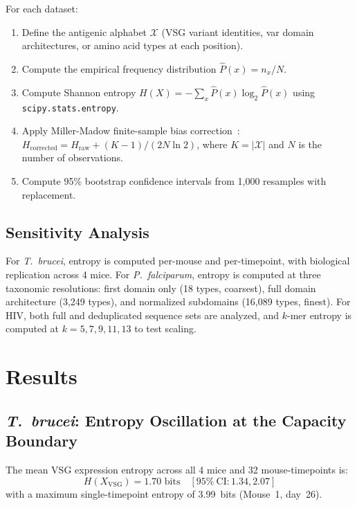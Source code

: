 \documentclass[twocolumn,10pt]{article}
\begin{document}
For each dataset:
\begin{enumerate}
\item Define the antigenic alphabet $\mathcal{X}$ (VSG variant identities, var domain architectures, or amino acid types at each position).
\item Compute the empirical frequency distribution $\hat{P}(x) = n_x / N$.
\item Compute Shannon entropy $H(X) = -\sum_x \hat{P}(x) \log_2 \hat{P}(x)$ using \texttt{scipy.stats.entropy}.
\item Apply Miller-Madow finite-sample bias correction~\citep{miller1955}: $H_{\text{corrected}} = H_{\text{raw}} + (K-1)/(2N\ln 2)$, where $K = |\mathcal{X}|$ and $N$ is the number of observations.
\item Compute 95\% bootstrap confidence intervals from 1,000 resamples with replacement.
\end{enumerate}

\subsection{Sensitivity Analysis}

For \textit{T.~brucei}, entropy is computed per-mouse and per-timepoint, with biological replication across 4 mice.  For \textit{P.~falciparum}, entropy is computed at three taxonomic resolutions: first domain only (18 types, coarsest), full domain architecture (3,249 types), and normalized subdomains (16,089 types, finest).  For HIV, both full and deduplicated sequence sets are analyzed, and $k$-mer entropy is computed at $k = 5, 7, 9, 11, 13$ to test scaling.

\section{Results}
\label{sec:results}

\subsection{\textit{T.~brucei}: Entropy Oscillation at the Capacity Boundary}
\label{sec:tbrucei}

The mean VSG expression entropy across all 4 mice and 32 mouse-timepoints is:
\begin{equation}
H(X_{\text{VSG}}) = 1.70 \text{~bits} \quad [95\%~\text{CI}: 1.34, 2.07]
\end{equation}
with a maximum single-timepoint entropy of 3.99~bits (Mouse~1, day~26).
\end{document}
